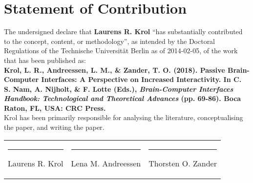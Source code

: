 \documentclass[a4paper,12pt]{article}
\title{}
\author{}
\date{}
\begin{document}
\thispagestyle{empty}

\section*{Statement of Contribution}

The undersigned declare that \textbf{Laurens R. Krol} ``has substantially contributed to the concept, content, or methodology'', as intended by the Doctoral Regulations of the Technische Universität Berlin as of 2014-02-05, of the work that has been published as: \\

\textbf{Krol, L. R., Andreessen, L. M., \& Zander, T. O. (2018). Passive Brain-Computer Interfaces: A Perspective on Increased Interactivity. In C. S. Nam, A. Nijholt, \& F. Lotte (Eds.), \emph{Brain-Computer Interfaces Handbook: Technological and Theoretical Advances} (pp. 69-86). Boca Raton, FL, USA: CRC Press.} \\

Krol has been primarily responsible for analysing the literature, conceptualising the paper, and writing the paper. \\

\begin{tabularx}{\textwidth}{XXX}
\vspace{2cm} \hrule Laurens R. Krol & \vspace{2cm} \hrule Lena M. Andreessen & \vspace{2cm} \hrule Thorsten O. Zander \\
\end{tabularx}
\end{document}
